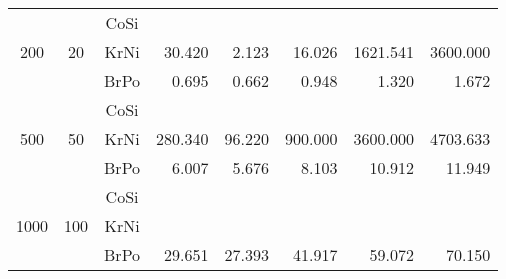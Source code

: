 \begin{tabular}{|c|c|c|r|r|r|r|r|}
  \hline
  \multirow{3}{*}{200}&
  \multirow{3}{*}{20}&
     CoSi &      \skip &      \skip &      \skip &      \skip &      \skip \\
  && KrNi &  30.420 &      2.123 &     16.026 &    1621.541 & 3600.000 \\
  && BrPo &      0.695 &      0.662 &      0.948 &      1.320 &      1.672 \\
  \hline
  \multirow{3}{*}{500}&
  \multirow{3}{*}{50}&
     CoSi &      \skip &      \skip &      \skip &      \skip &      \skip \\
  && KrNi & 280.340 &     96.220 & 900.000 & 3600.000 & 4703.633 \\
  && BrPo &      6.007 &      5.676 &      8.103 &     10.912 &     11.949 \\
  \hline
  \multirow{3}{*}{1000}&
  \multirow{3}{*}{100}&
     CoSi &      \skip &      \skip &      \skip &      \skip &      \skip \\
  && KrNi &      \skip &      \skip &      \skip &      \skip &      \skip \\
  && BrPo &     29.651 &     27.393 &     41.917 &     59.072 &     70.150 \\
  \hline
\end{tabular}
